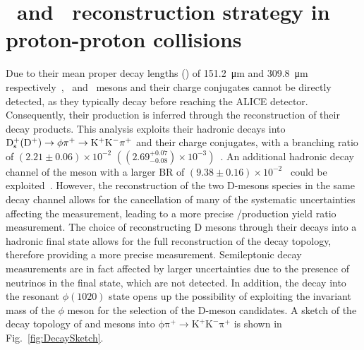 \chapter{\texorpdfstring{\ds\ and \dpl\ reconstruction strategy in proton-proton collisions}{Ds+ and D+ reconstruction strategy in proton-proton collisions}}\label{chap:reconstruction}

\begin{sloppypar}
Due to their mean proper decay lengths (\ct) of \SI{151.2}{\micro\meter} and \SI{309.8}{\micro\meter} respectively~\cite{pdg}, \ds\ and \dpl\ mesons and their charge conjugates cannot be directly detected, as they typically decay before reaching the ALICE detector. Consequently, their production is inferred through the reconstruction of their decay products. This analysis exploits their hadronic decays into $\mathrm{D_s^+} (\mathrm{D^+}) \rightarrow \mathrm{\phi\pi^+ \rightarrow K^+K^-\pi^+}$ and their charge conjugates, with a branching ratio of $(2.21\pm0.06)\times10^{-2}$ \mbox{$\left((2.69^{+0.07}_{-0.08})\times10^{-3}\right)$}~\cite{pdg}. An additional hadronic decay channel of the \dpl meson with a larger BR of \mbox{$(9.38\pm0.16)\times10^{-2}$}~\cite{pdg} could be exploited~\cite{ALICE:2017olh}. However, the reconstruction of the two D-mesons species in the same decay channel allows for the cancellation of many of the systematic uncertainties affecting the measurement, leading to a more precise \ds/\dpl production yield ratio measurement. The choice of reconstructing D mesons through their decays into a hadronic final state allows for the full reconstruction of the decay topology, therefore providing a more precise measurement. Semileptonic decay measurements are in fact affected by larger uncertainties due to the presence of neutrinos in the final state, which are not detected. In addition, the decay into the resonant $\phi(1020)$ state opens up the possibility of exploiting the invariant mass of the $\phi$ meson for the selection of the D-meson candidates. A sketch of the decay topology of \ds and \dpl mesons into $\mathrm{\phi\pi^+ \rightarrow K^+K^-\pi^+}$ is shown in Fig.~\ref{fig:DecaySketch}.
\end{sloppypar}


